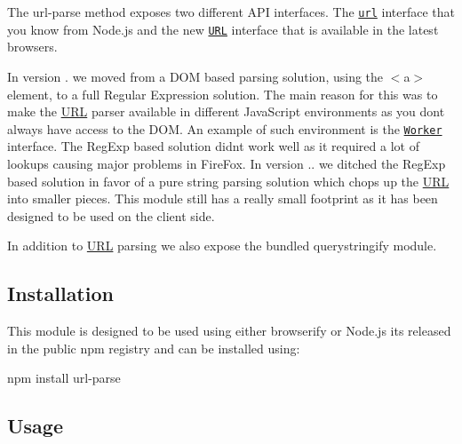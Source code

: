 \href{http://unshift.io}{\tt }\href{https://www.npmjs.com/package/url-parse}{\tt }\href{https://travis-ci.org/unshiftio/url-parse}{\tt }\href{https://david-dm.org/unshiftio/url-parse}{\tt }\href{https://coveralls.io/r/unshiftio/url-parse?branch=master}{\tt }\href{https://webchat.freenode.net/?channels=unshift}{\tt }

\href{https://saucelabs.com/u/url-parse}{\tt }

The {\ttfamily url-\/parse} method exposes two different A\+PI interfaces. The \href{https://nodejs.org/api/url.html}{\tt {\ttfamily url}} interface that you know from Node.\+js and the new \href{https://developer.mozilla.org/en-US/docs/Web/API/URL/URL}{\tt {\ttfamily U\+RL}} interface that is available in the latest browsers.

In version {.} we moved from a D\+OM based parsing solution, using the {\ttfamily $<$a$>$} element, to a full Regular Expression solution. The main reason for this was to make the \mbox{\hyperlink{namespace_u_r_l}{U\+RL}} parser available in different Java\+Script environments as you don\textquotesingle{}t always have access to the D\+OM. An example of such environment is the \href{https://developer.mozilla.org/en/docs/Web/API/Worker}{\tt {\ttfamily Worker}} interface. The Reg\+Exp based solution didn\textquotesingle{}t work well as it required a lot of lookups causing major problems in Fire\+Fox. In version {..} we ditched the Reg\+Exp based solution in favor of a pure string parsing solution which chops up the \mbox{\hyperlink{namespace_u_r_l}{U\+RL}} into smaller pieces. This module still has a really small footprint as it has been designed to be used on the client side.

In addition to \mbox{\hyperlink{namespace_u_r_l}{U\+RL}} parsing we also expose the bundled {\ttfamily querystringify} module.

\subsection*{Installation}

This module is designed to be used using either browserify or Node.\+js it\textquotesingle{}s released in the public npm registry and can be installed using\+:


\begin{DoxyCode}
npm install url-parse
\end{DoxyCode}


\subsection*{Usage}

